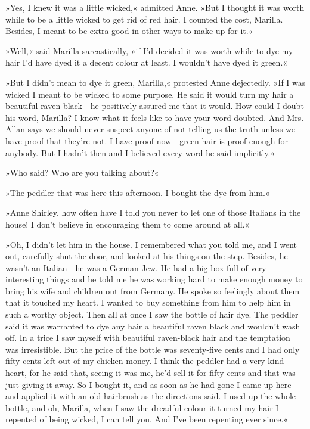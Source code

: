 »Yes, I knew it was a little wicked,« admitted Anne. »But I thought it was worth while to be a little wicked to get rid of red hair. I counted the cost, Marilla. Besides, I meant to be extra good in other ways to make up for it.«

»Well,« said Marilla sarcastically, »if I'd decided it was worth while to dye my hair I'd have dyed it a decent colour at least. I wouldn't have dyed it green.«

»But I didn't mean to dye it green, Marilla,« protested Anne dejectedly. »If I was wicked I meant to be wicked to some purpose. He said it would turn my hair a beautiful raven black—he positively assured me that it would. How could I doubt his word, Marilla? I know what it feels like to have your word doubted. And Mrs. Allan says we should never suspect anyone of not telling us the truth unless we have proof that they're not. I have proof now—green hair is proof enough for anybody. But I hadn't then and I believed every word he said implicitly.«

»Who said? Who are you talking about?«

»The peddler that was here this afternoon. I bought the dye from him.«

»Anne Shirley, how often have I told you never to let one of those Italians in the house! I don't believe in encouraging them to come around at all.«

»Oh, I didn't let him in the house. I remembered what you told me, and I went out, carefully shut the door, and looked at his things on the step. Besides, he wasn't an Italian—he was a German Jew. He had a big box full of very interesting things and he told me he was working hard to make enough money to bring his wife and children out from Germany. He spoke so feelingly about them that it touched my heart. I wanted to buy something from him to help him in such a worthy object. Then all at once I saw the bottle of hair dye. The peddler said it was warranted to dye any hair a beautiful raven black and wouldn't wash off. In a trice I saw myself with beautiful raven-black hair and the temptation was irresistible. But the price of the bottle was seventy-five cents and I had only fifty cents left out of my chicken money. I think the peddler had a very kind heart, for he said that, seeing it was me, he'd sell it for fifty cents and that was just giving it away. So I bought it, and as soon as he had gone I came up here and applied it with an old hairbrush as the directions said. I used up the whole bottle, and oh, Marilla, when I saw the dreadful colour it turned my hair I repented of being wicked, I can tell you. And I've been repenting ever since.«

